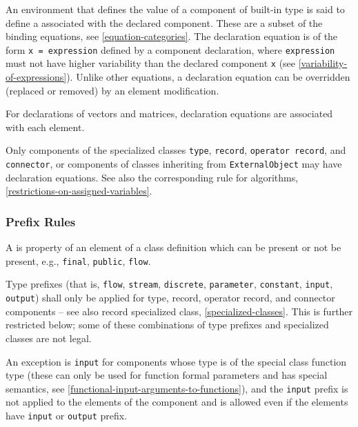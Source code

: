 An environment that defines the value of a component of built-in type is said to define a  associated with the declared component.
These are a subset of the binding equations, see \cref{equation-categories}.
The declaration equation is of the form \lstinline!x = expression! defined by a component declaration, where \lstinline!expression! must not have higher variability than the declared component \lstinline!x! (see \cref{variability-of-expressions}).
Unlike other equations, a declaration equation can be overridden (replaced or removed) by an element modification.

For declarations of vectors and matrices, declaration equations are associated with each element.

Only components of the specialized classes \lstinline!type!, \lstinline!record!, \lstinline!operator record!, and \lstinline!connector!, or components of classes inheriting from \lstinline!ExternalObject! may have declaration equations.
See also the corresponding rule for algorithms, \cref{restrictions-on-assigned-variables}.

\subsubsection{Prefix Rules}\label{prefix-rules}

A  is property of an element of a class definition which can be present or not be present, e.g., \lstinline!final!, \lstinline!public!, \lstinline!flow!.

Type prefixes (that is, \lstinline!flow!, \lstinline!stream!, \lstinline!discrete!, \lstinline!parameter!, \lstinline!constant!, \lstinline!input!, \lstinline!output!) shall only be applied for type, record, operator record, and connector components -- see also record specialized class, \cref{specialized-classes}.
This is further restricted below; some of these combinations of type prefixes and specialized classes are not legal.

An exception is \lstinline!input! for components whose type is of the special class function type (these can only be used for function formal parameters and has special semantics, see \cref{functional-input-arguments-to-functions}), and the \lstinline!input! prefix is not applied to the elements of the component and is allowed even if the elements have \lstinline!input! or \lstinline!output! prefix.

